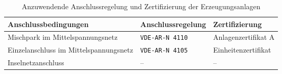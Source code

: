 {
\renewcommand{\arraystretch}{1.2}%
\begin{table}[H]
	\begin{center}
		\caption{Anzuwendende Anschlussregelung und Zertifizierung der Erzeugungsanlagen}
		\begin{tabu} to \textwidth {X[2] X X}
			\hline
			Anschlussbedingungen					&	Anschlussregelung				&	Zertifizierung		\\ \hline
			Mischpark im Mittelspannungsnetz		&	\texttt{VDE-AR-N \num{4110}}	&	Anlagenzertifikat A	\\
			Einzelanschluss im Mittelspannungsnetz	&	\texttt{VDE-AR-N \num{4105}}	&	Einheitenzertifikat	\\
			Inselnetzanschluss						&	{--}							&	{--}				\\ \hline
		\end{tabu}
		\label{tab:EZAVerfahren}
	\end{center}
	\vspace{-3mm}%
\end{table}
}